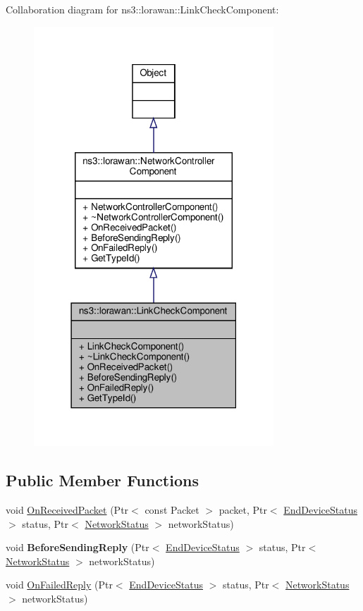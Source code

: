 Collaboration diagram for ns3\+:\+:lorawan\+:\+:Link\+Check\+Component\+:
\nopagebreak
\begin{figure}[H]
\begin{center}
\leavevmode
\includegraphics[width=255pt]{classns3_1_1lorawan_1_1LinkCheckComponent__coll__graph}
\end{center}
\end{figure}
\subsection*{Public Member Functions}
\begin{DoxyCompactItemize}
\item 
void \hyperlink{classns3_1_1lorawan_1_1LinkCheckComponent_a3a17d37153329a0b52b58e8f79675611}{On\+Received\+Packet} (Ptr$<$ const Packet $>$ packet, Ptr$<$ \hyperlink{classns3_1_1lorawan_1_1EndDeviceStatus}{End\+Device\+Status} $>$ status, Ptr$<$ \hyperlink{classns3_1_1lorawan_1_1NetworkStatus}{Network\+Status} $>$ network\+Status)
\item 
\mbox{\label{classns3_1_1lorawan_1_1LinkCheckComponent_aeae9ff3b922f090d4f0cb9397715e79b}} 
void {\bfseries Before\+Sending\+Reply} (Ptr$<$ \hyperlink{classns3_1_1lorawan_1_1EndDeviceStatus}{End\+Device\+Status} $>$ status, Ptr$<$ \hyperlink{classns3_1_1lorawan_1_1NetworkStatus}{Network\+Status} $>$ network\+Status)
\item 
void \hyperlink{classns3_1_1lorawan_1_1LinkCheckComponent_a256519f7da4d9d512ac1c1ce6bde4c1a}{On\+Failed\+Reply} (Ptr$<$ \hyperlink{classns3_1_1lorawan_1_1EndDeviceStatus}{End\+Device\+Status} $>$ status, Ptr$<$ \hyperlink{classns3_1_1lorawan_1_1NetworkStatus}{Network\+Status} $>$ network\+Status)
\end{DoxyCompactItemize}
